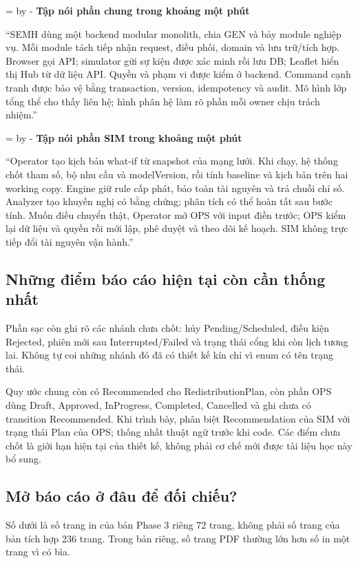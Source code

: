 \documentclass[12pt,a4paper]{article}
\newcommand{\Needspace}[1]{%
  \par\begingroup\dimen0=\pagegoal\advance\dimen0 by -\pagetotal
  \ifdim\dimen0<#1\relax\newpage\fi\endgroup}
\newcommand{\Point}[1]{\par\medskip\Needspace{4\baselineskip}\noindent\textbf{#1}\par\nobreak\smallskip}
\begin{document}
\Point{Tập nói phần chung trong khoảng một phút}
``SEMH dùng một backend modular monolith, chia GEN và bảy module nghiệp vụ. Mỗi module tách tiếp nhận request, điều phối, domain và lưu trữ/tích hợp. Browser gọi API; simulator gửi sự kiện được xác minh rồi lưu DB; Leaflet hiển thị Hub từ dữ liệu API. Quyền và phạm vi được kiểm ở backend. Command cạnh tranh được bảo vệ bằng transaction, version, idempotency và audit. Mô hình lớp tổng thể cho thấy liên hệ; hình phân hệ làm rõ phần mỗi owner chịu trách nhiệm.''

\Point{Tập nói phần SIM trong khoảng một phút}
``Operator tạo kịch bản what-if từ snapshot của mạng lưới. Khi chạy, hệ thống chốt tham số, bộ nhu cầu và modelVersion, rồi tính baseline và kịch bản trên hai working copy. Engine giữ rule cấp phát, bảo toàn tài nguyên và trả chuỗi chỉ số. Analyzer tạo khuyến nghị có bằng chứng; phân tích có thể hoàn tất sau bước tính. Muốn điều chuyển thật, Operator mở OPS với input điền trước; OPS kiểm lại dữ liệu và quyền rồi mới lập, phê duyệt và theo dõi kế hoạch. SIM không trực tiếp đổi tài nguyên vận hành.''

\subsection{Những điểm báo cáo hiện tại còn cần thống nhất}
Phần sạc còn ghi rõ các nhánh chưa chốt: hủy Pending/Scheduled, điều kiện Rejected, phiên mới sau Interrupted/Failed và trạng thái cổng khi còn lịch tương lai. Không tự coi những nhánh đó đã có thiết kế kín chỉ vì enum có tên trạng thái.

Quy ước chung còn có Recommended cho RedistributionPlan, còn phần OPS dùng Draft, Approved, InProgress, Completed, Cancelled và ghi chưa có transition Recommended. Khi trình bày, phân biệt Recommendation của SIM với trạng thái Plan của OPS; thống nhất thuật ngữ trước khi code. Các điểm chưa chốt là giới hạn hiện tại của thiết kế, không phải cơ chế mới được tài liệu học này bổ sung.

\subsection{Mở báo cáo ở đâu để đối chiếu?}
Số dưới là số trang in của bản Phase 3 riêng 72 trang, không phải số trang của bản tích hợp 236 trang. Trong bản riêng, số trang PDF thường lớn hơn số in một trang vì có bìa.
\end{document}
